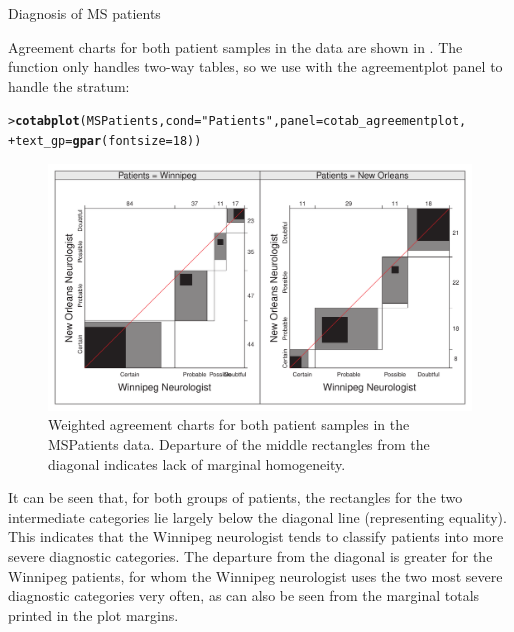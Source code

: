 \documentclass[10pt,krantz2]{krantz}\usepackage[]{graphicx}\usepackage[]{color}
\makeatletter
\newcommand{\hlnum}[1]{\textcolor[rgb]{0.686,0.059,0.569}{#1}}%
\newcommand{\hlstr}[1]{\textcolor[rgb]{0.192,0.494,0.8}{#1}}%
\newcommand{\hlstd}[1]{\textcolor[rgb]{0.345,0.345,0.345}{#1}}%
\newcommand{\hlkwc}[1]{\textcolor[rgb]{0.333,0.667,0.333}{#1}}%
\newcommand{\hlkwd}[1]{\textcolor[rgb]{0.737,0.353,0.396}{\textbf{#1}}}%
\newenvironment{kframe}{%
 \def\at@end@of@kframe{}%
 \ifinner\ifhmode%
  \def\at@end@of@kframe{\end{minipage}}%
  \begin{minipage}{\columnwidth}%
 \fi\fi%
 \def\FrameCommand##1{\hskip\@totalleftmargin \hskip-\fboxsep
 \colorbox{shadecolor}{##1}\hskip-\fboxsep
     \hskip-\linewidth \hskip-\@totalleftmargin \hskip\columnwidth}%
 \MakeFramed {\advance\hsize-\width
   \@totalleftmargin\z@ \linewidth\hsize
   \@setminipage}}%
 {\par\unskip\endMakeFramed%
 \at@end@of@kframe}
\newenvironment{knitrout}{}{} %
\renewenvironment{knitrout}{\small\renewcommand{\baselinestretch}{.85}}{} %
\makeatother
\begin{document}
\begin{Example}[MS2]{Diagnosis of MS patients}

Agreement charts for both patient samples in the  data
are shown in . The  function
only handles two-way tables, so we use  with the
agreementplot panel to handle the  stratum:

\begin{knitrout}
\color{fgcolor}\begin{kframe}
\begin{alltt}
\hlstd{> }\hlkwd{cotabplot}\hlstd{(MSPatients,} \hlkwc{cond} \hlstd{=} \hlstr{"Patients"}\hlstd{,} \hlkwc{panel} \hlstd{= cotab_agreementplot,}
\hlstd{+ }          \hlkwc{text_gp} \hlstd{=} \hlkwd{gpar}\hlstd{(}\hlkwc{fontsize} \hlstd{=} \hlnum{18}\hlstd{))}
\end{alltt}
\end{kframe}\begin{figure}[!htbp]

\centerline{\includegraphics[width=\textwidth]{ch04/fig/MS-agree-1} }

\caption[Weighted agreement charts for both patient samples in the MSPatients data]{Weighted agreement charts for both patient samples in the MSPatients data. Departure of the middle rectangles from the diagonal indicates lack of marginal homogeneity.}\label{fig:MS-agree}
\end{figure}


\end{knitrout}

It can be seen that, for
both groups of patients, the rectangles for the
two intermediate categories lie largely below the diagonal line
(representing equality).  This
indicates that the Winnipeg neurologist tends to classify patients
into more severe diagnostic categories.
The departure from the diagonal is greater for the Winnipeg patients,
for whom the Winnipeg neurologist uses the two most severe diagnostic
categories very often, as can also be seen from the marginal totals
printed in the plot margins.


\end{Example}
\end{document}
